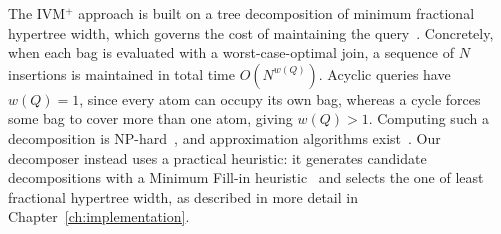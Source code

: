 \medskip

The IVM$^+$ approach is built on a tree decomposition of minimum fractional hypertree width, which governs the cost of maintaining the query~\cite{abokhamis2024Insert-Only}.
Concretely, when each bag is evaluated with a worst-case-optimal join, a sequence of $N$ insertions is maintained in total time $O(N^{w(Q)})$. 
Acyclic queries have $w(Q) = 1$, since every atom can occupy its own bag, whereas a cycle forces some bag to cover more than one atom, giving $w(Q) > 1$.
Computing such a decomposition is NP-hard~\cite{fischl2018}, and approximation algorithms exist~\cite{marx2010}.
Our decomposer instead uses a practical heuristic: it generates candidate decompositions with a Minimum Fill-in heuristic~\cite{bodlaender2005} and selects the one of least fractional hypertree width, as described in more detail in Chapter~\ref{ch:implementation}.

